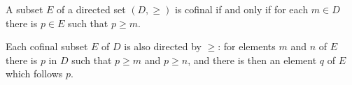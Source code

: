 A subset $E$ of a directed set $(D, \geq)$ is cofinal if and only if for each $m \in D$ there is $p \in E$ such that $p \geq m$.

Each cofinal subset $E$ of $D$ is also directed by $\geq$: for elements $m$ and $n$ of $E$ there is $p$ in $D$ such that $p \geq m$ and $p \geq n$, and there is then an element $q$ of $E$ which follows $p$.
